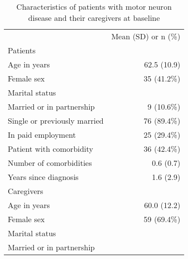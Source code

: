 \documentclass{article}
\begin{document}
\begin{table}[!h]
\caption{Characteristics of patients with motor neuron disease and their caregivers at baseline}
\centering
\begin{tabular}{ll}
\cline{1-2}
\multicolumn{1}{r}{} &
  \multicolumn{1}{c}{Mean (SD) or n (\%)} \\
\cline{1-2}
\multicolumn{1}{l}{Patients} &
  \multicolumn{1}{r}{} \\
\multicolumn{1}{l}{\hspace{1em}Age in years} &
  \multicolumn{1}{r}{62.5 (10.9)} \\
\multicolumn{1}{l}{\hspace{1em}Female sex} &
  \multicolumn{1}{r}{35 (41.2\%)} \\
\multicolumn{1}{l}{\hspace{1em}Marital status} &
  \multicolumn{1}{r}{} \\
\multicolumn{1}{l}{\hspace{2em}Married or in partnership} &
  \multicolumn{1}{r}{9 (10.6\%)} \\
\multicolumn{1}{l}{\hspace{2em}Single or previously married} &
  \multicolumn{1}{r}{76 (89.4\%)} \\
\multicolumn{1}{l}{\hspace{1em}In paid employment} &
  \multicolumn{1}{r}{25 (29.4\%)} \\
\multicolumn{1}{l}{\hspace{1em}Patient with comorbidity} &
  \multicolumn{1}{r}{36 (42.4\%)} \\
\multicolumn{1}{l}{\hspace{1em}Number of comorbidities} &
  \multicolumn{1}{r}{0.6 (0.7)} \\
\multicolumn{1}{l}{\hspace{1em}Years since diagnosis} &
  \multicolumn{1}{r}{1.6 (2.9)} \\
\multicolumn{1}{l}{Caregivers} &
  \multicolumn{1}{r}{} \\
\multicolumn{1}{l}{\hspace{1em}Age in years} &
  \multicolumn{1}{r}{60.0 (12.2)} \\
\multicolumn{1}{l}{\hspace{1em}Female sex} &
  \multicolumn{1}{r}{59 (69.4\%)} \\
\multicolumn{1}{l}{\hspace{1em}Marital status} &
  \multicolumn{1}{r}{} \\
\multicolumn{1}{l}{\hspace{2em}Married or in partnership} &

\end{tabular}
\end{table}
\end{document}
